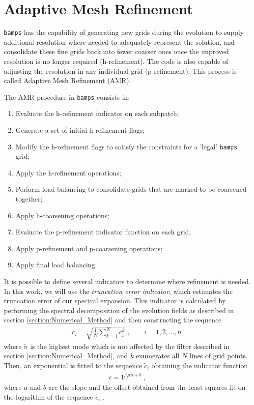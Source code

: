 \section{Adaptive Mesh Refinement}
\label{section:amr}

\texttt{bamps} has the capability of generating new grids during the evolution to supply additional resolution where needed to adequately represent the solution, and consolidate these fine grids back into fewer coarser ones once the improved resolution is no longer required (h-refinement). The code is also capable of adjusting the resolution in any individual grid (p-refinement). This process is called Adaptive Mesh Refinement (AMR).

The AMR procedure in \texttt{bamps} consists in:
%
\begin{enumerate}
    \item Evaluate the h-refinement indicator on each subpatch;
    \item Generate a set of initial h-refinement flags;
    \item Modify the h-refinement flags to satisfy the constraints for a 'legal' \texttt{bamps} grid;
    \item Apply the h-refinement operations;
    \item Perform load balancing to consolidate grids that are marked to be coarsened together;
    \item Apply h-coarsening operations;
    \item Evaluate the p-refinement indicator function on each grid;
    \item Apply p-refinement and p-coarsening operations;
    \item Apply final load balancing.
\end{enumerate}

It is possible to define several indicators to determine where refinement is needed. In this work, we will use the \textit{truncation error indicator}, which estimates the truncation error of our spectral expansion. This indicator is calculated by performing the spectral decomposition of the evolution fields as described in section \ref{section:Numerical_Method} and then constructing the sequence
%
\begin{align}
    \tilde{c}_i = \sqrt{\frac{1}{N} \sum_{k=1}^N c_i^k} \; , \quad \quad i = 1, 2, \ldots, \tilde{n} \;
\end{align}
%
where $\tilde{n}$ is the highest mode which is not affected by the filter described in section \ref{section:Numerical_Method}, and $k$ enumerates all $N$ lines of grid points. Then, an exponential is fitted to the sequence $\tilde{c}_i$ obtaining the indicator function
%
\begin{align}
    \epsilon = 10^{a \tilde{n} + b} \; ,
\end{align}
%
where $a$ and $b$ are the slope and the offset obtained from the least squares fit on the logarithm of the sequence $\tilde{c}_i$ \cite{Adaptive_hp_refinement_for_spectral_elements_in_numerical_relativity}.

